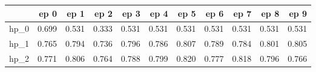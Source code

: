 \begin{tabular}{lrrrrrrrrrr}
\toprule
{} &   ep 0 &   ep 1 &   ep 2 &   ep 3 &   ep 4 &   ep 5 &   ep 6 &   ep 7 &   ep 8 &   ep 9 \\
\midrule
hp\_0 &  0.699 &  0.531 &  0.333 &  0.531 &  0.531 &  0.531 &  0.531 &  0.531 &  0.531 &  0.531 \\
hp\_1 &  0.765 &  0.794 &  0.736 &  0.796 &  0.786 &  0.807 &  0.789 &  0.784 &  0.801 &  0.805 \\
hp\_2 &  0.771 &  0.806 &  0.764 &  0.788 &  0.799 &  0.820 &  0.777 &  0.818 &  0.796 &  0.766 \\
\bottomrule
\end{tabular}
